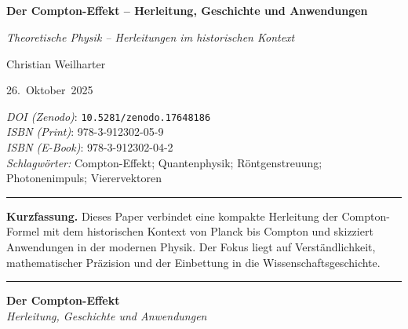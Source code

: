 \documentclass[12pt,oneside]{scrartcl}
\title{\PaperTitle\\[0.5em]\large \SeriesTitle}
\author{\PaperAuthor}
\date{\PaperDate}
\renewcommand*{\bibfont}{\small}
\newcommand{\SeriesTitle}{Theoretische Physik – Herleitungen im historischen Kontext}
\newcommand{\PaperTitle}{Der Compton-Effekt – Herleitung, Geschichte und Anwendungen}
\newcommand{\PaperAuthor}{Christian Weilharter}
\newcommand{\PaperDate}{26.\ Oktober\ 2025}
\newcommand{\PaperDOI}{\emph{DOI (Zenodo)}: \texttt{10.5281/zenodo.17648186}}
\newcommand{\PaperISBNPDF}{\emph{ISBN (Print)}: 978-3-912302-05-9}
\newcommand{\PaperISBNEPUB}{\emph{ISBN (E-Book)}: 978-3-912302-04-2}
\newcommand{\PaperKeywords}{Compton-Effekt; Quantenphysik; Röntgenstreuung; Photonenimpuls; Vierervektoren}
\newcommand{\PaperMetadata}{
	\vspace{1em}
	\begin{flushleft}
		\small
		\setlength{\parskip}{3pt}
		\noindent\PaperDOI\\
		\PaperISBNPDF\\
		\PaperISBNEPUB\\
		\textit{Schlagwörter:} \PaperKeywords
	\end{flushleft}
	\vspace{1em}
}
\begin{document}
	
	\thispagestyle{empty}
	\begin{center}
		{\Huge\bfseries \PaperTitle\par}
		\vspace{0.5em}
		{\Large\itshape \SeriesTitle\par}
		\vspace{2em}
		{\Large \PaperAuthor\par}
		\vspace{0.5em}
		{\large \PaperDate\par}
	\end{center}
	
	\PaperMetadata
	
	\vspace{1em}
	\hrule
	\vspace{1em}
	
	\noindent\textbf{Kurzfassung.}  
	Dieses Paper verbindet eine kompakte Herleitung der Compton-Formel mit dem historischen Kontext von Planck bis Compton und skizziert Anwendungen in der modernen Physik. Der Fokus liegt auf Verständlichkeit, mathematischer Präzision und der Einbettung in die Wissenschaftsgeschichte.
	
	\vspace{1em}
	\hrule
	\vspace{2em}
	
	
	
	
	
	
	
	
    

	
	\renewcommand*{\bibfont}{\small}
	
	\printbibliography
	\clearpage
	\thispagestyle{empty}
	
	\vspace*{1.5cm}
	
	{\Large\bfseries Der Compton-Effekt}\\[0.5em]
	{\large\itshape Herleitung, Geschichte und Anwendungen}
	
	\vspace{1.2cm}
	
\end{document}
